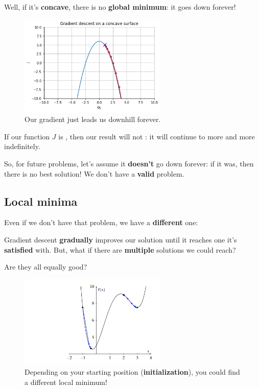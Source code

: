         Well, if it's \textbf{concave}, there is no \textbf{global minimum}: it goes down forever!\\
        
        \begin{figure}[H]
        \centering
            \includegraphics[width=70mm,scale=0.5]{images/gradient_descent_images/gradient_descent_on_a_concave_surface.png}
        
        \caption*{Our gradient just leads us downhill forever.}
        \end{figure}
        
        \begin{concept}
            If our function $J$ is , then our result will not : it will continue to  more and more indefinitely.
        \end{concept}
        
        So, for future problems, let's assume it \textbf{doesn't} go down forever: if it was, then there is no best solution! We don't have a \textbf{valid} problem.
        
    \subsection{Local minima}
        
        Even if we don't have that problem, we have a \textbf{different} one:
        
        Gradient descent \textbf{gradually} improves our solution until it reaches one it's \textbf{satisfied} with. But, what if there are \textbf{multiple} solutions we could reach?
        
        Are they all equally good?
        
        \begin{figure}[H]
        \centering
            \includegraphics[width=70mm,scale=0.5]{images/gradient_descent_images/Two_Local_Minima.png}
        
        \caption*{Depending on your starting position (\textbf{initialization}), you could find a different local minimum!}
        \end{figure}
        
